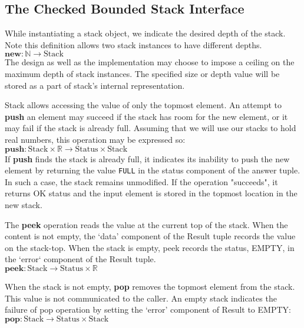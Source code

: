 \documentclass[10pt]{article}
\begin{document}
  \subsection{The Checked Bounded Stack Interface}
  \noindent While instantiating a stack object, we indicate the desired depth of the stack. Note this definition allows two stack instances to have different depths.
  \vspace*{6pt}\\\hspace*{32pt}\(
  \textbf{new}: \mathbb{N} \rightarrow \mathrm{Stack}
  \)\vspace*{6pt}\\
  The design as well as the implementation may choose to impose a ceiling on the maximum depth of stack instances. The specified size or depth value will be stored as a part of stack's internal representation.  

  Stack allows accessing the value of only the topmost element. An attempt to \textbf{push} an element may succeed if the stack has room for the new element, or it may fail if the stack is already full. Assuming that we will use our stacks to hold real numbers, this operation may be expressed so:
  \vspace*{6pt}\\\hspace*{32pt}\(
  \textbf{push}: \mathrm{Stack} \times \mathbb{R} \rightarrow \mathrm{Status \times Stack}
  \)\vspace*{6pt}\\
  If \textbf{push} finds the stack is already full, it indicates its inability to push the new element by returning the value \texttt{FULL} in the status component of the answer tuple. In such a case, the stack remains unmodified. If the operation "succeeds", it returns OK status and the input element is stored in the topmost location in the new stack.

  The \textbf{peek} operation reads the value at the current top of the stack. When the content is not empty, the `data' component of the Result tuple records the value on the stack-top. When the stack is empty, peek records the status, EMPTY, in the `error` component of the Result tuple.
  \vspace*{6pt}\\\hspace*{32pt}\(
  \textbf{peek}: \mathrm{Stack} \rightarrow \mathrm{Status \times \mathbb{R}}
  \)\vspace*{6pt}

  When the stack is not empty, {\textbf{pop}} removes the topmost element from the stack. This value is not communicated to the caller. An empty stack indicates the failure of pop operation by setting the `error' component of Result to EMPTY:
  \vspace*{6pt}\\\hspace*{32pt}\(
  \textbf{pop}: \mathrm{Stack} \rightarrow \mathrm{Status \times Stack}
  \)\vspace*{6pt}
\end{document}
